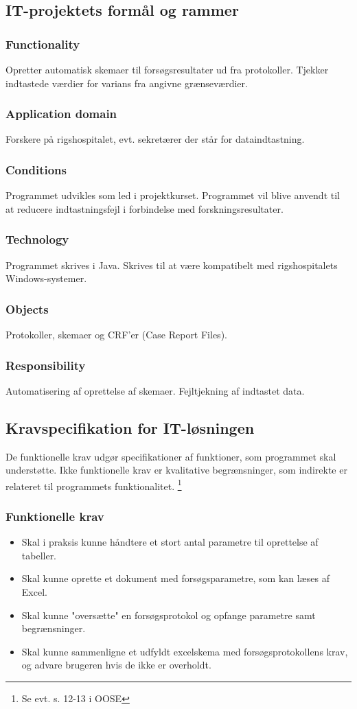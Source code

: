 \documentclass[11pt]{article}
\begin{document}
\subsection{IT-projektets formål og rammer}
\subsubsection{Functionality}
Opretter automatisk skemaer til forsøgsresultater ud fra protokoller. Tjekker indtastede værdier for varians fra angivne grænseværdier.
\subsubsection{Application domain}
Forskere på rigshospitalet, evt. sekretærer der står for dataindtastning.
\subsubsection{Conditions}
Programmet udvikles som led i projektkurset. Programmet vil blive anvendt til at reducere indtastningsfejl i forbindelse med forskningsresultater.
\subsubsection{Technology}
Programmet skrives i Java. Skrives til at være kompatibelt med rigshospitalets Windows-systemer.
\subsubsection{Objects}
Protokoller, skemaer og CRF'er (Case Report Files).
\subsubsection{Responsibility}
Automatisering af oprettelse af skemaer. Fejltjekning af indtastet data.

\subsection{Kravspecifikation for IT-løsningen}
De funktionelle krav udgør specifikationer af funktioner, som programmet skal understøtte. Ikke funktionelle krav er kvalitative begrænsninger, som indirekte er relateret til programmets funktionalitet. \footnote{Se evt. s. 12-13 i OOSE\cite{OOSE}}
\subsubsection{Funktionelle krav}
\begin{itemize}
  \item Skal i praksis kunne håndtere et stort antal parametre til oprettelse af tabeller.
  \item Skal kunne oprette et dokument med forsøgsparametre, som kan læses af Excel.
  \item Skal kunne "oversætte" en forsøgsprotokol og opfange parametre samt begrænsninger.
  \item Skal kunne sammenligne et udfyldt excelskema med forsøgsprotokollens krav, og advare brugeren hvis de ikke er overholdt.
\end{itemize}
\end{document}
